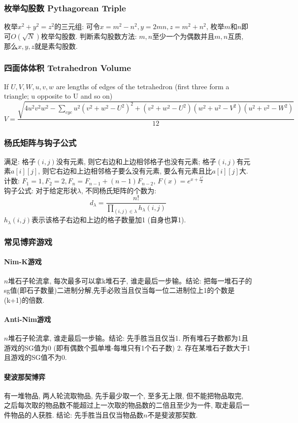 \subsubsection{枚举勾股数 Pythagorean Triple}
枚举$x^2+y^2=z^2$的三元组: 可令$x=m^2-n^2,y=2mn,z=m^2+n^2$, 枚举$m$和$n$即可$O(\sqrt{N})$枚举勾股数. 判断素勾股数方法: $m,n$至少一个为偶数并且$m,n$互质, 那么$x,y,z$就是素勾股数.
\subsubsection{四面体体积 Tetrahedron Volume}
If $U, V, W, u, v, w$ are lengths of edges of the tetrahedron (first three form a triangle; u opposite to U and so on)
\[ V = \frac{\sqrt{ 4u^2v^2w^2 - \sum_{cyc}{u^2(v^2+w^2-U^2)^2} + (v^2+w^2-U^2)(w^2+u^2-V^2)(u^2+v^2-W^2)}}{12} \]
\subsubsection{杨氏矩阵与钩子公式}
满足: 格子$(i,j)$没有元素, 则它右边和上边相邻格子也没有元素; 格子$(i,j)$有元素$a[i][j]$, 则它右边和上边相邻格子要么没有元素, 要么有元素且比$a[i][j]$大.\\
计数: $F_1=1,F_2=2,F_n=F_{n-1}+(n-1)F_{n-2}$, $F(x)=e^{x+\frac{x^2}{2}}$\\
钩子公式: 对于给定形状$\lambda$, 不同杨氏矩阵的个数为:
\[d_\lambda=\frac{n!}{\prod_{(i,j) \in \lambda} h_\lambda(i,j)}\]
$h_\lambda(i,j)$表示该格子右边和上边的格子数量加1 (自身也算1). 

\subsubsection{常见博弈游戏}
\paragraph{Nim-K游戏}$n$堆石子轮流拿, 每次最多可以拿k堆石子, 谁走最后一步输。结论: 把每一堆石子的sg值(即石子数量)二进制分解,先手必败当且仅当每一位二进制位上1的个数是(k+1)的倍数. 
\paragraph{Anti-Nim游戏}$n$堆石子轮流拿, 谁走最后一步输。结论: 先手胜当且仅当1. 所有堆石子数都为1且游戏的SG值为0 (即有偶数个孤单堆-每堆只有1个石子数) 2. 存在某堆石子数大于1且游戏的SG值不为0.
\paragraph{斐波那契博弈}有一堆物品, 两人轮流取物品, 先手最少取一个, 至多无上限, 但不能把物品取完, 之后每次取的物品数不能超过上一次取的物品数的二倍且至少为一件, 取走最后一件物品的人获胜. 结论: 先手胜当且仅当物品数$n$不是斐波那契数. 
